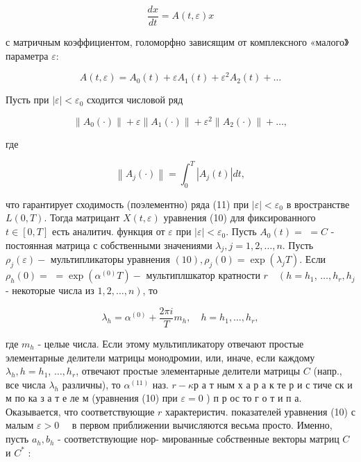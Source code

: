 \documentclass[10pt]{article}
\begin{document}
\[

\frac{d x}{d t}=A(t, \varepsilon) x

\]



с матричным коэффициентом, голоморфно зависящим от комплексного «малого》 параметра $\varepsilon:$



\[

A(t, \varepsilon)=A_{0}(t)+\varepsilon A_{1}(t)+\varepsilon^{2} A_{2}(t)+\ldots

\]



Пусть при $|\varepsilon|<\varepsilon_{0}$ сходится числовой ряд



\[

\left\|A_{0}(\cdot)\right\|+\varepsilon\left\|A_{1}(\cdot)\right\|+\varepsilon^{2}\left\|A_{2}(\cdot)\right\|+\ldots,

\]



где



\[

\left\|A_{j}(\cdot)\right\|=\int_{0}^{T}\left|A_{j}(t)\right| d t,

\]



что гарантирует сходимость (поэлементно) ряда (11) при $|\varepsilon|<\varepsilon_{0}$ в вространстве $L(0, T)$. Тогда матрицант $X(t, \varepsilon)$ уравнения (10) для фиксированного $t \in[0, T]$ есть аналитич. функция от $\varepsilon$ при $|\varepsilon|<\varepsilon_{0}$. Пусть $A_{0}(t)=$ $=C$ - постоянная матрица с собственными значениями $\lambda_{j}, j=1,2, \ldots, n$. Пусть $\rho_{j}(\varepsilon)-$ мультипликаторы уравнения $(10), \rho_{j}(0)=\exp \left(\lambda_{j} T\right)$. Если $\rho_{h}(0)=$ $=\exp \left(\alpha^{(0)} T\right)-$ мультиплшкатор кратности $r \quad\left(h=h_{1}\right.$, $\ldots, h_{r}, h_{j}$ - некоторые числа из $\left.1,2, \ldots, n\right)$, то



\[

\lambda_{h}=\alpha^{(0)}+\frac{2 \pi i}{T} m_{h}, \quad h=h_{1}, \ldots, h_{r},

\]



где $m_{h}$ - целые числа. Если этому мультипликатору отвечают простые элементарные делители матрицы монодромии, или, иначе, если каждому $\lambda_{h}, h=h_{1}$, $\ldots, h_{r}$, отвечают простые элементарные делители матрицы $C$ (напр., все числа $\lambda_{h}$ различны), то $\alpha^{(11)}$ наз. $r-\kappa р$ а т ным х а р а к те р и с тиче ск и м по ка з а т е ле м (уравнения (10) при $\varepsilon=0$ ) п р ос то г о т и п а. Оказывается, что соответствующие $r$ характеристич. показателей уравнения (10) с малым $\varepsilon>0 \quad$ в первом приближении вычисляются весьма просто. Именно, пусть $a_{h}, b_{h}$ - соответствующие нор- мированные собственные векторы матриц $C$ и $C^{*}$ :
\end{document}
